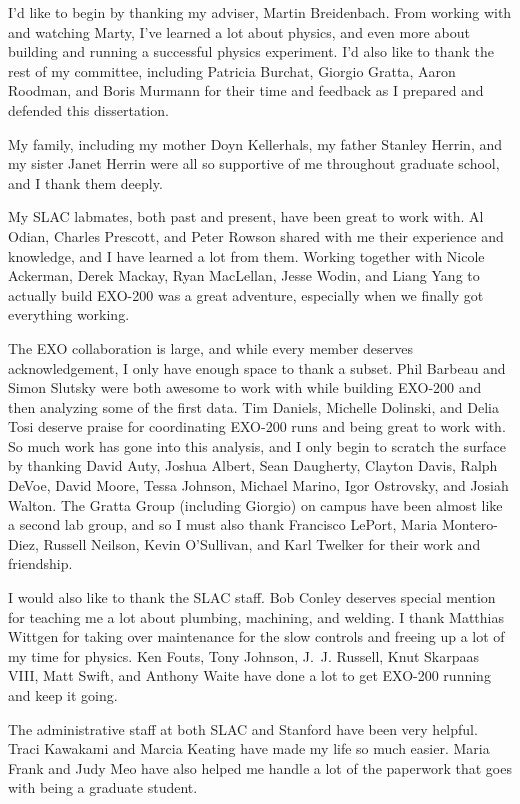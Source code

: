 I'd like to begin by thanking my adviser, Martin Breidenbach. From working with and watching Marty, I've learned a lot about physics, and even more about building and running a successful physics experiment. I'd also like to thank the rest of my committee, including Patricia Burchat, Giorgio Gratta, Aaron Roodman, and Boris Murmann for their time and feedback as I prepared and defended this dissertation.

My family, including my mother Doyn Kellerhals, my father Stanley Herrin, and my sister Janet Herrin were all so supportive of me throughout graduate school, and I thank them deeply. 

My SLAC labmates, both past and present, have been great to work with. Al Odian, Charles Prescott, and Peter Rowson shared with me their experience and knowledge, and I have learned a lot from them. Working together with Nicole Ackerman, Derek Mackay, Ryan MacLellan, Jesse Wodin, and Liang Yang to actually build EXO-200 was a great adventure, especially when we finally got everything working.

The EXO collaboration is large, and while every member deserves acknowledgement, I only have enough space to thank a subset. Phil Barbeau and Simon Slutsky were both awesome to work with while building EXO-200 and then analyzing some of the first data. Tim Daniels, Michelle Dolinski, and Delia Tosi deserve praise for coordinating EXO-200 runs and being great to work with. So much work has gone into this analysis, and I only begin to scratch the surface by thanking David Auty, Joshua Albert, Sean Daugherty, Clayton Davis, Ralph DeVoe, David Moore, Tessa Johnson, Michael Marino, Igor Ostrovsky, and Josiah Walton. The Gratta Group (including Giorgio) on campus have been almost like a second lab group, and so I must also thank Francisco LePort, Maria Montero-Diez, Russell Neilson, Kevin O'Sullivan, and Karl Twelker for their work and friendship.

I would also like to thank the SLAC staff. Bob Conley deserves special mention for teaching me a lot about plumbing, machining, and welding. I thank Matthias Wittgen for taking over maintenance for the slow controls and freeing up a lot of my time for physics. Ken Fouts, Tony Johnson, J.~J. Russell, Knut Skarpaas VIII, Matt Swift, and Anthony Waite have done a lot to get EXO-200 running and keep it going.

The administrative staff at both SLAC and Stanford have been very helpful. Traci Kawakami and Marcia Keating have made my life so much easier. Maria Frank and Judy Meo have also helped me handle a lot of the paperwork that goes with being a graduate student.

